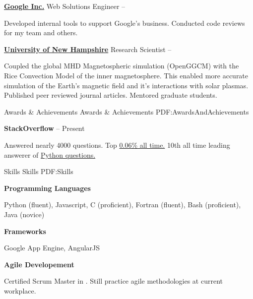 \documentclass[letterpaper,MMMyyyy,nonstopmode]{simpleresumecv}
\begin{document}
\begin{Body}
\BigGap
\Entry
\href {https://google.com}{\textbf{Google Inc.}}
\Gap
\BulletItem
Web Solutions Engineer
\hfill
{} -- 
\begin{Detail}
\SubBulletItem
Developed internal tools to support Google's business.
\SubBulletItem
Conducted code reviews for my team and others.
\end{Detail}

\BigGap
\Entry
\href {http://www.unh.edu/}{\textbf{University of New Hampshire}}
\Gap
\BulletItem
Research Scientist
\hfill
{} -- 
\begin{Detail}
\SubBulletItem
Coupled the global MHD Magnetospheric simulation (OpenGGCM) with the Rice Convection
Model of the inner magnetosphere.  This enabled more accurate simulation of the
Earth's magnetic field and it's interactions with solar plasmas.
\SubBulletItem
Published peer reviewed journal articles.
\SubBulletItem
Mentored graduate students.
\end{Detail}



\Section
{Awards \&\newline
Achievements}
{Awards \& Achievements}
{PDF:AwardsAndAchievements}

\Entry
\textbf{StackOverflow}
\hfill
{} -- Present
\begin{Detail}
\Item
Answered nearly 4000 questions.
\Item
Top \href{http://stackoverflow.com/cv/matthew-gilson-428809}{0.06\% all time.}
\Item
10th all time leading answerer of \href{http://stackoverflow.com/tags/python/topusers}{Python questions.}
\end{Detail}



\Section
{Skills}
{Skills}
{PDF:Skills}

\Entry
\textbf{Programming Languages}
\begin{Detail}
\Item Python (fluent), Javascript, C (proficient), Fortran (fluent), Bash (proficient), Java (novice)
\end{Detail}

\BigGap
\Entry
\textbf{Frameworks}
\begin{Detail}
\Item Google App Engine, AngularJS
\end{Detail}

\BigGap
\Entry
\textbf{Agile Developement}
\begin{Detail}
\Item Certified Scrum Master in .  Still practice agile methodologies
at current workplace.
\end{Detail}


\end{Body}
\end{document}
